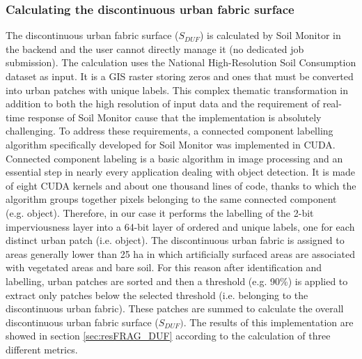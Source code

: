 \documentclass[APA,LATO1COL,doublespace]{WileyNJD-v2}
\begin{document}
\subsubsection{ Calculating the discontinuous urban fabric surface }
\label{sec:mmDUF}
The discontinuous urban fabric surface ($S_{DUF}$) is calculated by Soil Monitor in the backend and the user cannot directly manage it (no dedicated job submission). %
The calculation uses the National High-Resolution Soil Consumption dataset as input. It is a GIS raster storing zeros and ones that must be converted into urban patches with unique labels. This complex thematic transformation in addition to both the high resolution of input data and the requirement of real-time response of Soil Monitor cause that the implementation is absolutely challenging. %
To address these requirements, a connected component labelling algorithm specifically developed for Soil Monitor was implemented in CUDA.
Connected component labeling is a basic algorithm in image processing and an essential step in nearly every application dealing with object detection.
It is made of eight CUDA kernels and about one thousand lines of code, thanks to which the algorithm groups together pixels belonging to the same connected component (e.g. object).
Therefore, in our case it performs the labelling of the 2-bit imperviousness layer into a 64-bit layer of ordered and unique labels, one for each distinct urban patch (i.e. object).
The discontinuous urban fabric is assigned to areas generally lower than 25 ha in which artificially surfaced areas are associated with vegetated areas and bare soil.
For this reason after identification and labelling, urban patches are sorted and then a threshold (e.g. 90\%) is applied to extract only patches below the selected threshold (i.e. belonging to the discontinuous urban fabric).
These patches are summed to calculate the overall discontinuous urban fabric surface ($S_{DUF})$.
The results of this implementation are showed in section \ref{sec:resFRAG_DUF} according to the calculation of three different metrics.
\end{document}
